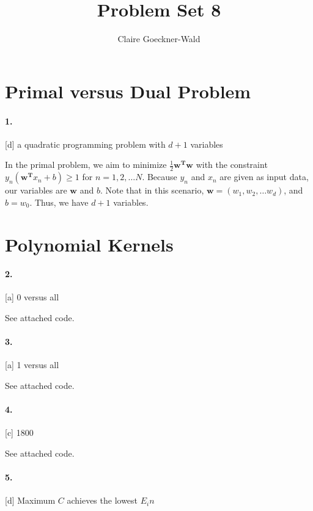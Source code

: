 \documentclass[10pt,letter]{article}
\begin{document}
\title{Problem Set 8}
\author{Claire Goeckner-Wald}
\maketitle 

\section*{Primal versus Dual Problem}

\paragraph{1.} [d] a quadratic programming problem with $d+1$ variables

	In the primal problem, we aim to minimize $\frac{1}{2} \bm{w^T}\bm{w}$ with the constraint $y_n(\bm{w^T}x_n +b) \geq 1$ for $n = 1, 2, \dots N$. Because $y_n$ and $x_n$ are given as input data, our variables are $\bm{w}$ and $b$. Note that in this scenario, $\bm{w} = (w_1, w_2, \dots w_d)$, and $b = w_0$. Thus, we have $d+1$ variables. 

\section*{Polynomial Kernels}

\paragraph{2.} [a] 0 versus all

	See attached code. 

\paragraph{3.} [a] 1 versus all

	See attached code. 

\paragraph{4.} [c] 1800

	See attached code. 

\paragraph{5.} [d] Maximum $C$ achieves the lowest $E_in$
\end{document}
